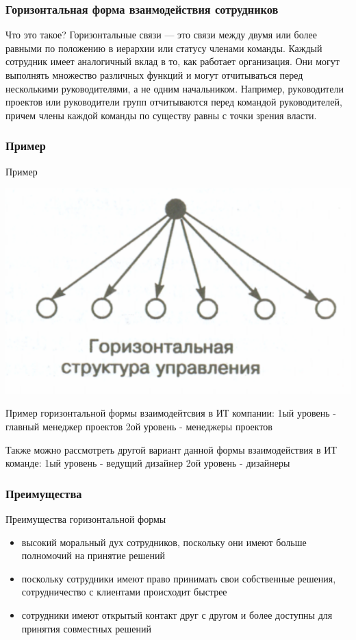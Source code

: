 \documentclass{industrial-development}
\begin{document}
\begin{frame} \frametitle{Горизонтальная форма взаимодействия сотрудников}
  \begin{block}{Что это такое?}
Горизонтальные связи — это связи между двумя или более равными по положению в иерархии или статусу членами команды. Каждый сотрудник имеет аналогичный вклад в то, как работает организация. Они могут выполнять множество различных функций и могут отчитываться перед несколькими руководителями, а не одним начальником. Например, руководители проектов или руководители групп отчитываются перед командой руководителей, причем члены каждой команды по существу равны с точки зрения власти.
  \end{block}
\end{frame}

\begin{frame} \frametitle{Пример}
  \begin{block}{Пример}
\centerline{\includegraphics[width=1\textwidth]{horizontal.pdf}}
  \end{block}
\end{frame}

\lecturenotes
Пример горизонтальной формы взаимодейтсвия в ИТ компании:
1ый уровень - главный менеджер проектов
2ой уровень - менеджеры проектов

Также можно рассмотреть другой вариант данной формы взаимодействия в ИТ команде:
1ый уровень -  ведущий дизайнер
2ой уровень - дизайнеры

\begin{frame} \frametitle{Преимущества}
  \begin{block}{Преимущества горизонтальной формы}
  \end{block}
  
  \begin{itemize}
  \item высокий моральный дух сотрудников, поскольку они имеют больше полномочий на принятие решений
  \item поскольку сотрудники  имеют право принимать свои собственные решения, сотрудничество с клиентами происходит быстрее
  \item сотрудники имеют открытый контакт друг с другом и более доступны для принятия совместных решений
  \end{itemize}
\end{frame}
\end{document}
